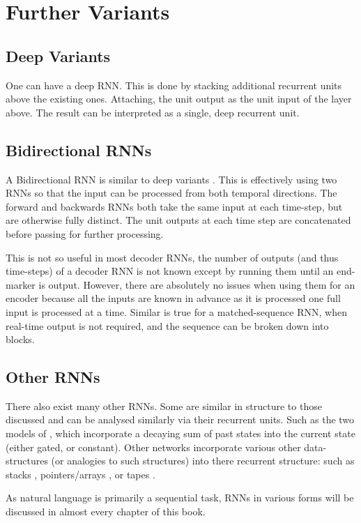 \documentclass[12pt,parskip]{komatufte}
\begin{document}
\section{Further Variants}
\subsection{Deep Variants}
One can have a deep RNN.
This is done by stacking additional recurrent units above the existing ones.
Attaching, the unit output as the unit input of the layer above.
The result can be interpreted as a single, deep recurrent unit.

\subsection{Bidirectional RNNs}\label{sec:bidirection-rnns}
A Bidirectional RNN is similar to deep variants .
This is effectively using two RNNs so that the input can be processed from both temporal directions.
The forward and backwards RNNs both take the same input at each time-step, but are otherwise fully distinct.
The unit outputs at each time step are concatenated before passing for further processing.

This is not so useful in most decoder RNNs, the number of outputs (and thus time-steps) of a decoder RNN is not known except by running them until an end-marker is output.
However, there are absolutely no issues when using them for an encoder because all the inputs are known in advance as it is processed one full input is processed at a time.
Similar is true for a matched-sequence RNN, when real-time output is not required, and the sequence can be broken down into blocks.


\subsection{Other RNNs}
There also exist many other RNNs.
Some are similar in structure to those discussed and can be analysed similarly via their recurrent units.
Such as the two models of , which incorporate a decaying sum of past states into the current state (either gated, or constant).
Other networks incorporate various other data-structures (or analogies to such structures) into there recurrent structure:
such as stacks , pointers/arrays , or tapes .

As natural language is primarily a sequential task, RNNs in various forms will be discussed in almost every chapter of this book.

\end{document}
